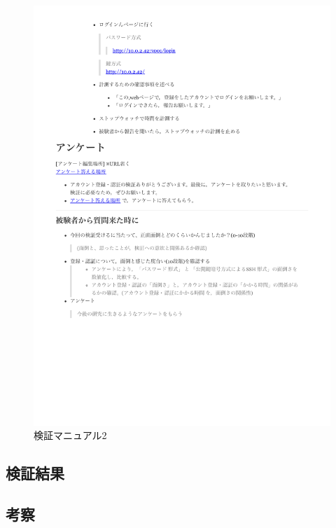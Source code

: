  \vspace{4cm}%
 \begin{figure}[H]
     \includegraphics[width=15cm]{./fig/chapter4/inspect_1/manual/manual_2.pdf}
     \caption{検証マニュアル2}
     \label{検証マニュアル２}
 \end{figure}

 \subsection{検証結果}
 \subsection{考察}





\newpage





